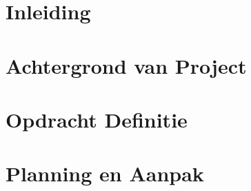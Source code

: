 \documentclass{../local}
\begin{document}
\chapter{Inleiding}

\newpage\null\thispagestyle{empty}

\renewcommand{\thesection}{\arabic{section}}

\renewcommand*\contentsname{Inhoud}
\thispagestyle{empty}
\setcounter{page}{0}
\tableofcontents
\clearpage

\chapter{Achtergrond van Project} 


\chapter{Opdracht Definitie}


\chapter{Planning en Aanpak}


%
%


%
\end{document}
